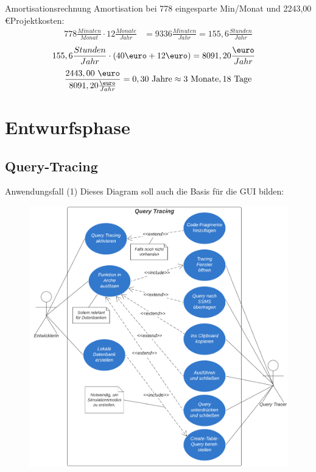 \documentclass[toc]{beamer}
\begin{document}
    
    \begin{frame}{Amortisationsrechnung}
   Amortisation bei 778 eingesparte Min/Monat und 2243,00 \euro\space Projektkosten:
    \begin{align}
    778\frac{Minuten}{Monat}\cdot 12\frac{Monate}{Jahr}&=9336\frac{Minuten}{Jahr}=155,6\frac{Stunden}{Jahr}
\end{align}
\begin{align}
    155,6\frac{Stunden}{Jahr}\cdot(40 \text{\euro} + 12 \text{\euro})&=8091,20\frac{\text{\euro}}{Jahr}
\end{align}
\begin{align}
    \frac{2443,00 \text{ \euro}}{8091,20 \frac{\text{\euro}}{Jahr}}=0,30 \text{ Jahre}
    \approx 3 \text{ Monate}, 18 \text{ Tage}
\end{align}%
    \end{frame}

\section{Entwurfsphase}
    \subsection{Query-Tracing}
        \begin{frame}{Anwendungsfall (1)}
        Dieses Diagram soll auch die Basis für die GUI bilden:
            \begin{figure}[htp]
                   \includegraphics[scale=0.7]{Anwendungsfalldiagramm_2.png}
                    
                    \end{figure}
        \end{frame}
        
\end{document}
